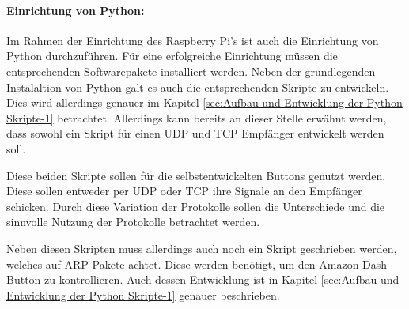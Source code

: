 \paragraph{Einrichtung von Python:}$\;$ \\
\label{sec:Python Skripte-1} 
Im Rahmen der Einrichtung des Raspberry Pi's ist auch die Einrichtung von Python durchzuführen. Für eine erfolgreiche Einrichtung müssen die entsprechenden Softwarepakete installiert werden.  Neben der grundlegenden Instalaltion von Python galt es auch die entsprechenden Skripte zu entwickeln. Dies wird allerdings genauer im Kapitel \ref{sec:Aufbau und Entwicklung der Python Skripte-1} betrachtet. Allerdings kann bereits an dieser Stelle erwähnt werden, dass sowohl ein Skript für einen \ac{UDP} und \ac{TCP} Empfänger entwickelt werden soll. 

Diese beiden Skripte sollen für die selbstentwickelten Buttons genutzt werden. Diese sollen entweder per \ac{UDP} oder \ac{TCP} ihre Signale an den Empfänger schicken. Durch diese Variation der Protokolle sollen die Unterschiede und die sinnvolle Nutzung der Protokolle betrachtet werden. 

Neben diesen Skripten muss allerdings auch noch ein Skript geschrieben werden, welches auf \ac{ARP} Pakete achtet. Diese werden benötigt, um den Amazon Dash Button zu kontrollieren. Auch dessen Entwicklung ist in Kapitel \ref{sec:Aufbau und Entwicklung der Python Skripte-1} genauer beschrieben. 
